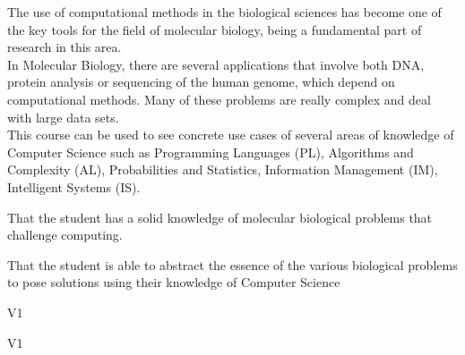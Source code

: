 \begin{syllabus}


\begin{justification}
The use of computational methods in the biological sciences has become one of the key tools for the field of molecular biology, being a fundamental part of research in this area.
\\
In Molecular Biology, there are several applications that involve both DNA, protein analysis or sequencing of the human genome, which depend on computational methods. Many of these problems are really complex and deal with large data sets.
\\
This course can be used to see concrete use cases of several areas of knowledge of Computer Science such as Programming Languages (PL), Algorithms and Complexity (AL), Probabilities and Statistics, Information Management (IM), Intelligent Systems (IS).
\end{justification}

\begin{goals}
\item That the student has a solid knowledge of molecular biological problems that challenge computing.
\item That the student is able to abstract the essence of the various biological problems to pose solutions using their knowledge of Computer Science
\end{goals}

\begin{outcomes}{V1}
    \item {}
    \item {}
    \item {}
\end{outcomes}

\begin{competences}{V1}
    \item {} 
    \item {}
    \item {}
\end{competences}


\end{syllabus}
